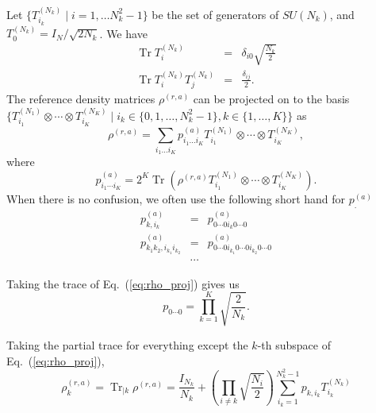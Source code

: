 \documentclass{article}
\DeclareMathOperator{\Tr}{Tr}
\begin{document}
Let $\{T^{(N_k)}_{i_k}\mid i = 1,\ldots N_k^2-1\}$ be the set of generators
of $SU(N_k)$, and $T^{(N_k)}_0 = I_N/\sqrt{2N_k}$.  We have
\begin{eqnarray}
  \label{eq:trace_t}
  \Tr T^{(N_k)}_i & = & \delta_{i0}\sqrt{\frac{N_k}2} \\
  \label{eq:trace_t_t}
  \Tr T^{(N_k)}_iT^{(N_k)}_j & = &\frac{\delta_{ij}}2.
\end{eqnarray}
The reference density matrices $\rho^{(r,a)}$ can be projected on to the basis
$\{T^{(N_1)}_{i_1}\otimes\cdots\otimes T^{(N_K)}_{i_K}\mid i_k\in \{0, 1, \ldots, N_k^2-1\}, k \in \{1,\ldots,K\}\}$ as
\begin{equation}
  \label{eq:rho_proj}
  \rho^{(r,a)} = \sum_{i_1 \ldots i_K}p^{(a)}_{i_1\ldots i_K}T^{(N_1)}_{i_1}\otimes\cdots\otimes T^{(N_K)}_{i_K},
\end{equation}
where
\begin{equation}
  p^{(a)}_{i_1\cdots i_K} = 2^K\Tr\left(\rho^{(r,a)}T^{(N_1)}_{i_1}\otimes\cdots\otimes T^{(N_K)}_{i_K}\right).
\end{equation}
When there is no confusion, we often use the following short hand for $p^{(a)}_{.}$
\begin{eqnarray}
  \label{eq:p_k}
  p^{(a)}_{k,i_k} & = & p^{(a)}_{0\cdots0i_k0\cdots0} \\
  \label{eq:p_k1_k2}
  p^{(a)}_{k_1k_2,i_{k_1}i_{k_2}} & = & p^{(a)}_{0\cdots0i_{k_1}0\cdots0i_{k_2}0\cdots0} \\
  & \cdots &  
\end{eqnarray}

Taking the trace of Eq.~(\ref{eq:rho_proj}) gives us
\begin{equation}
  p_{0\cdots0} = \prod_{k=1}^K\sqrt{\frac{2}{N_k}}.
\end{equation}

Taking the partial trace for everything except the $k$-th subspace
of Eq.~(\ref{eq:rho_proj}),
\begin{equation}
  \rho^{(r,a)}_k = \Tr_{|k}\rho^{(r,a)} = \frac{I_{N_k}}{N_k}
  + \left(\prod_{i\ne k}\sqrt{\frac{N_i}2}\right)\sum_{i_k=1}^{N_k^2-1}p_{k,i_k}T^{(N_k)}_{i_k}
\end{equation}
\end{document}
